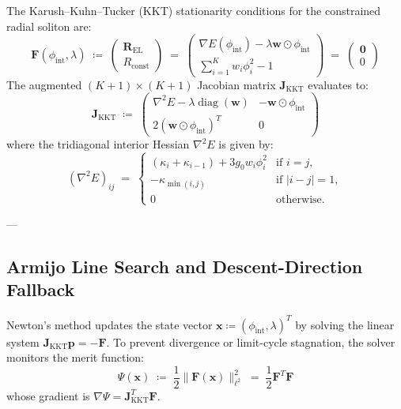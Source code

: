 \documentclass[
    12pt,
    a4paper,
    headings=normal,
    twoside=false,
    open=any,
    parskip=half
]{scrbook}
\begin{document}
\begin{phystheorem}\label{thm:ch3_bordered_kkt}
The Karush--Kuhn--Tucker (KKT) stationarity conditions for the constrained radial soliton are:
\begin{equation}
\mathbf{F}(\phi_{\text{int}}, \lambda) \;\coloneqq\; \begin{pmatrix} \mathbf{R}_{\text{EL}} \\ R_{\text{const}} \end{pmatrix} \;=\; \begin{pmatrix} \nabla E(\phi_{\text{int}}) - \lambda \mathbf{w} \odot \phi_{\text{int}} \\ \sum_{i=1}^K w_i \phi_i^2 - 1 \end{pmatrix} \;=\; \begin{pmatrix} \mathbf{0} \\ 0 \end{pmatrix}
\label{eq:ch3_kkt_residual_vector}
\end{equation}
The augmented $(K+1) \times (K+1)$ Jacobian matrix $\mathbf{J}_{\text{KKT}}$ evaluates to:
\begin{equation}
\mathbf{J}_{\text{KKT}} \;\coloneqq\; \begin{pmatrix}
\nabla^2 E - \lambda \operatorname{diag}(\mathbf{w}) & -\mathbf{w} \odot \phi_{\text{int}} \\
2 (\mathbf{w} \odot \phi_{\text{int}})^T & 0
\end{pmatrix}
\label{eq:ch3_bordered_jacobian_matrix}
\end{equation}
where the tridiagonal interior Hessian $\nabla^2 E$ is given by:
\begin{equation}
(\nabla^2 E)_{ij} \;=\; \begin{cases}
(\kappa_i + \kappa_{i-1}) + 3 g_0 w_i \phi_i^2 & \text{if } i = j, \\
-\kappa_{\min(i,j)} & \text{if } |i - j| = 1, \\
0 & \text{otherwise}.
\end{cases}
\end{equation}
\end{phystheorem}

---

\subsection{Armijo Line Search and Descent-Direction Fallback}

Newton's method updates the state vector $\mathbf{x} \coloneqq (\phi_{\text{int}}, \lambda)^T$ by solving the linear system $\mathbf{J}_{\text{KKT}} \mathbf{p} = -\mathbf{F}$. To prevent divergence or limit-cycle stagnation, the solver monitors the merit function:
\begin{equation}
\Psi(\mathbf{x}) \;\coloneqq\; \frac{1}{2} \| \mathbf{F}(\mathbf{x}) \|_{\ell^2}^2 \;=\; \frac{1}{2} \mathbf{F}^T \mathbf{F}
\label{eq:ch3_merit_function}
\end{equation}
whose gradient is $\nabla \Psi = \mathbf{J}_{\text{KKT}}^T \mathbf{F}$.
\end{document}

